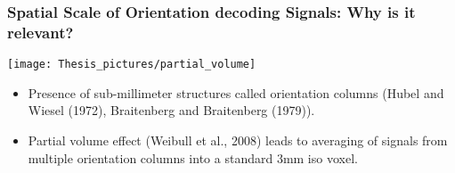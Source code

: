 \documentclass{beamer}
\begin{document}
  
	\begin{frame}
		\frametitle{Spatial Scale of Orientation decoding Signals: Why is it relevant?}
		\begin{center}
			\texttt{[image: Thesis\_pictures/partial\_volume]}
		\end{center}
		\begin{itemize}
			\item Presence of sub-millimeter structures called orientation 
			columns (Hubel and Wiesel (1972), Braitenberg and Braitenberg (1979)).
			\item Partial volume effect (Weibull et al., 2008) leads to 
			averaging of signals from multiple orientation columns into a standard 3mm iso voxel.
		\end{itemize}
	\end{frame}
	
	
	
\end{document}
